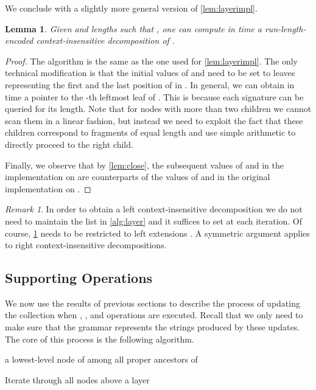 \documentclass[a4paper]{article}
\newtheorem{lemma}[theorem]{Lemma}
\theoremstyle{remark}
\newtheorem{remark}[theorem]{Remark}
\begin{document}
We conclude with a slightly more general version of \cref{lem:layerimpl}.
\begin{lemma}\label{lem:layerimpl2}
Given  and lengths  such that , one can compute in time 
a run-length-encoded context-insensitive decomposition of .
\end{lemma}
\begin{proof}
The algorithm is the same as the one used for  \cref{lem:layerimpl}.
The only technical modification is that the initial values of  and  need to be set to leaves representing the first and the last position of 
in . In general, we can obtain in  time a pointer to the -th leftmost leaf of .
This is because each signature can be queried for its length. Note that for nodes with more than two children we cannot scan
them in a linear fashion, but instead we need to exploit the fact that these children correspond to fragments of equal length
and use simple arithmetic to directly proceed to the right child.

Finally, we observe that by \cref{lem:close}, the subsequent values of  and  in the implementation on 
are counterparts of the values of  and  in the original implementation on .
\end{proof}

\begin{remark}\label{remark:left-context}
In order to obtain a left context-insensitive decomposition we do not need to maintain the list  in \cref{alg:layer} and it suffices to set  at each iteration. Of course, \cref{lem:layerimpl2} needs to be restricted to left extensions
. A symmetric argument applies to right context-insensitive decompositions.
\end{remark}

\subsection{Supporting Operations}
We now use the results of previous sections to describe the process of updating the collection
when , , and  operations are executed.
Recall that we only need to make sure that the grammar 
represents the strings produced by these updates.
The core of this process is the following algorithm.

\begin{algorithm}
\begin{algorithmic}[1]
\Function{}{}
\While{}
\State  a lowest-level node of  among all proper ancestors of \label{line:ancestor}
\State 
\EndWhile
\EndFunction
\end{algorithmic}
\caption{Iterate through all nodes above a layer }
\label{alg:layers}
\end{algorithm}
\end{document}
